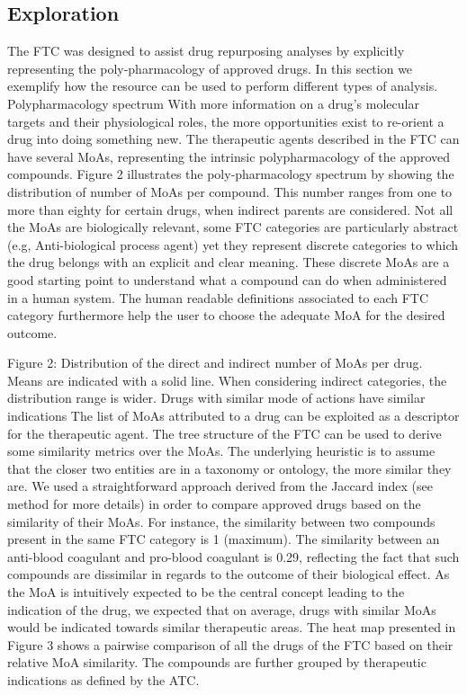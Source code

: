 \documentclass{bioinfo}
\begin{document}
\subsection{Exploration}
The FTC was designed to assist drug repurposing analyses by explicitly representing the poly-pharmacology of 
approved drugs. In this section we exemplify how the resource can be used to perform different types of analysis.
Polypharmacology spectrum
With more information on a drug’s molecular targets and their physiological roles, the more opportunities 
exist to re-orient a drug into doing something new. The therapeutic agents described in the FTC can have several MoAs, 
representing the intrinsic polypharmacology of the approved compounds. Figure 2 illustrates the poly-pharmacology 
spectrum by showing the distribution of number of MoAs per compound. This number ranges from one to more 
than eighty for certain drugs, when indirect parents are considered. Not all the MoAs are biologically relevant, 
some FTC categories are particularly abstract (e.g, Anti-biological process agent) yet they represent discrete 
categories to which the drug belongs with an explicit and clear meaning. These discrete MoAs are a good starting 
point to understand what a compound can do when administered in a human system. The human readable definitions 
associated to each FTC category furthermore help the user to choose the adequate MoA for the desired outcome.
 
Figure 2: Distribution of the direct and indirect number of MoAs per drug. Means are indicated with a solid line. 
When considering indirect categories, the distribution range is wider.
Drugs with similar mode of actions have similar indications
The list of MoAs attributed to a drug can be exploited as a descriptor for the therapeutic agent. 
The tree structure of the FTC can be used to derive some similarity metrics over the MoAs. The underlying 
heuristic is to assume that the closer two entities are in a taxonomy or ontology, the more similar they are. 
We used a straightforward approach derived from the Jaccard index (see method for more details) in order to compare 
approved drugs based on the similarity of their MoAs. For instance, the similarity between two compounds present in 
the same FTC category is 1 (maximum). The similarity between an anti-blood coagulant and pro-blood coagulant is 0.29, 
reflecting the fact that such compounds are dissimilar in regards to the outcome of their biological effect. As the MoA is 
intuitively expected to be the central concept leading to the indication of the drug, we expected that on average, drugs with 
similar MoAs would be indicated towards similar therapeutic areas. The heat map presented in Figure 3 shows a pairwise 
comparison of all the drugs of the FTC based on their relative MoA similarity. The compounds are further grouped by 
therapeutic indications as defined by the ATC.
 
\end{document}
